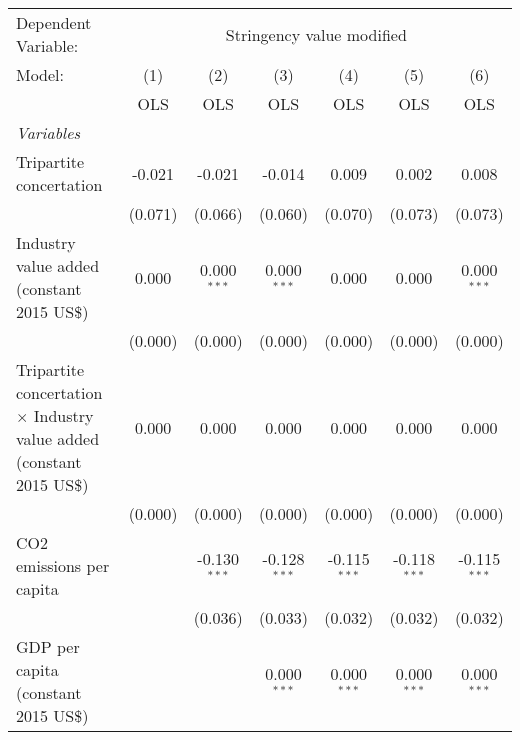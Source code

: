
\begingroup
\centering
\begin{tabular}{lcccccc}
   \toprule
   Dependent Variable: & \multicolumn{6}{c}{Stringency value modified}\\
   Model:                                                                       & (1)     & (2)            & (3)            & (4)            & (5)            & (6)\\  
                                                                                &  OLS    & OLS            & OLS            & OLS            & OLS            & OLS\\  
   \midrule
   \emph{Variables}\\
   Tripartite concertation                                                      & -0.021  & -0.021         & -0.014         & 0.009          & 0.002          & 0.008\\   
                                                                                & (0.071) & (0.066)        & (0.060)        & (0.070)        & (0.073)        & (0.073)\\   
   Industry value added (constant 2015 US\$)                                    & 0.000   & 0.000$^{***}$  & 0.000$^{***}$  & 0.000          & 0.000          & 0.000$^{***}$\\   
                                                                                & (0.000) & (0.000)        & (0.000)        & (0.000)        & (0.000)        & (0.000)\\   
   Tripartite concertation $\times$ Industry value added (constant 2015 US\$)   & 0.000   & 0.000          & 0.000          & 0.000          & 0.000          & 0.000\\   
                                                                                & (0.000) & (0.000)        & (0.000)        & (0.000)        & (0.000)        & (0.000)\\   
   CO2 emissions per capita                                                     &         & -0.130$^{***}$ & -0.128$^{***}$ & -0.115$^{***}$ & -0.118$^{***}$ & -0.115$^{***}$\\   
                                                                                &         & (0.036)        & (0.033)        & (0.032)        & (0.032)        & (0.032)\\   
   GDP per capita (constant 2015 US\$)                                          &         &                & 0.000$^{***}$  & 0.000$^{***}$  & 0.000$^{***}$  & 0.000$^{***}$\\   

\end{tabular}
